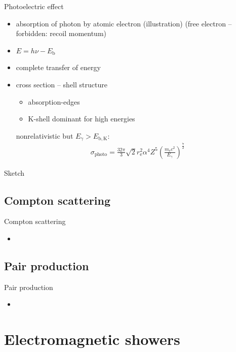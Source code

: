 \documentclass[11pt,xcolor=dvipsnames,professionalfonts]{beamer}
\begin{document}
\begin{frame}{Photoelectric effect}
	\begin{itemize}
		\item absorption of photon by atomic electron (illustration) (free electron -- forbidden: recoil momentum)
		\item $E = h \nu - E_\mathrm{b}$
		\item complete transfer of energy
		\item cross section -- shell structure
		\begin{itemize}
			\item absorption-edges
			\item K-shell dominant for high energies
		\end{itemize}
		nonrelativistic but $E_\gamma > E_\mathrm{b, K}$:
		\begin{align*}
			\sigma_\mathrm{photo} = \frac{32 \pi}{3} \sqrt{2} r_\mathrm{e}^2  \alpha^4  Z^5 \left( \frac{m_\mathrm{e} c^2}{E_\gamma}\right)^\frac{7}{2} 
		\end{align*}		
	\end{itemize}
\end{frame}

\begin{frame}{Sketch}

\end{frame}


\subsection{Compton scattering}

\begin{frame}{Compton scattering}
	\begin{itemize}
		\item
	\end{itemize}
\end{frame}

\subsection{Pair production}

\begin{frame}{Pair production}
	\begin{itemize}
		\item
	\end{itemize}
\end{frame}



\section{Electromagnetic showers}
\end{document}
